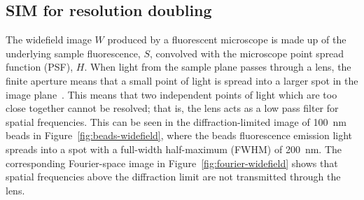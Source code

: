 \subsection{SIM for resolution doubling} \label{sec:SIM-theory}
The widefield image $W$ produced by a fluorescent microscope is made up of the underlying sample fluorescence, $S$, convolved with the microscope point spread function (PSF), $H$. 
When light from the sample plane passes through a lens, the finite aperture means that a small point of light is spread into a larger spot in the image plane~\cite[\textit{ch. 11}]{hecht2017optics}. 
This means that two independent points of light which are too close together cannot be resolved; that is, the lens acts as a low pass filter for spatial frequencies. 
This can be seen in the diffraction-limited image of \SI{100}{\nano\metre} beads in Figure~\ref{fig:beads-widefield}, where the beads fluorescence emission light spreads into a spot with a full-width half-maximum (FWHM) of \SI{200}{\nano\metre}. 
The corresponding Fourier-space image in Figure~\ref{fig:fourier-widefield} shows that spatial frequencies above the diffraction limit are not transmitted through the lens. 

